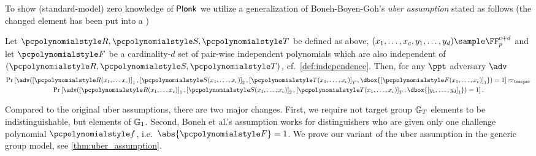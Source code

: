 \documentclass[runningheads,11pt]{llncs}
\newcommand\dboxed[1]{\dbox{\ensuremath{#1}}}
\begin{document}
To show (standard-model) zero knowledge of $\textnormal{\textsf{Plonk}}$ we utilize a generalization
of Boneh-Boyen-Goh's \emph{uber assumption} \cite{EC:BonBoyGoh05} stated as
follows (the changed element has been put into a )
\begin{definition}
	\label{def:uber_assumption}
	Let $\pR, \pS, \pT$ be defined as above,
    $(x_1, \ldots, x_c, y_1, \ldots, y_{d}) \sample \FF_p^{c + d}$ and let
    $\p{F}$ be a cardinality-$d$ set of pair-wise independent polynomials which are also
    independent of $(\pR, \pS, \pT)$, cf.~\cref{def:independence}.  Then, for
    any $\ppt$ adversary $\adv$
	\begin{multline*}
      \Pr\left[\adv(\gone{\pR(x_1, \ldots x_c)}, \gtwo{\pS(x_1, \ldots, x_c)},
		\gtar{\pT(x_1, \ldots, x_c)}, \dboxed{\gone{\p{F}(x_1, \ldots, x_c)}}) = 1\right] \approx_\secpar \\
      \Pr\left[\adv(\gone{\pR(x_1, \ldots x_c)}, \gtwo{\pS(x_1, \ldots, x_c)},
        \gtar{\pT(x_1, \ldots, x_c)}, \dboxed{\gone{y_1, \ldots, y_{d}}}) =
        1\right].
	\end{multline*}
  \end{definition}

  Compared to the original uber assumptions, there are two major changes. First,
  we require not target group $\mathbb{G}_T$ elements to be indistinguishable, but
  elements of $\mathbb{G}_1$. Second, Boneh et al.'s assumption works for
  distinguishers who are given only one challenge polynomial $\p{f}$,
  i.e.~$\abs{\p{F}} = 1$.  We prove our variant of the uber assumption in the
  generic group model, see \cref{thm:uber_assumption}.
\end{document}
